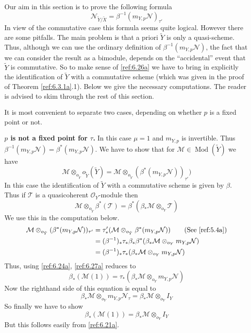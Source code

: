 \documentclass{amsproc}
\def\Mscr{{\mathcal M}}
\def\Nscr{{\mathcal N}}
\def\Oscr{{\mathcal O}}
\def\Tscr{{\mathcal T}}
\def\Qch{\operatorname {Mod}}
\let\oldtext\text
\def\text#1{\oldtext{\upshape #1}}
\theoremstyle{definition}
\theoremstyle{remark}
\numberwithin{equation}{section}
\numberwithin{table}{section}
\numberwithin{figure}{section}
\begin{document}
Our aim in this section is to prove the following formula
\begin{equation}
\label{ref:6.26a}
\Nscr_{{\tilde{Y}}/{\tilde{X}}}=\beta^{-1}(m_{Y,p}\Nscr)_{\tau'}
\end{equation}
In view of the commutative case this formula seems quite logical.
However there are some pitfalls. The main problem is that a priori ${\tilde{Y}}$
is only a quasi-scheme. Thus, although we can use the ordinary
definition of $\beta^{-1}(m_{Y,p}\Nscr)$, the fact that we can
consider the result as a bimodule, depends on the ``accidental'' event
that ${\tilde{Y}}$ is commutative. So to make sense of \eqref{ref:6.26a} we
have to bring in explicitly the identification of ${\tilde{Y}}$ with a
commutative scheme (which was given in the proof of Theorem
\ref{ref:6.3.1a}.1). Below we give the necessary computations. The
reader is advised to skim through the rest of this section.


It is most convenient to separate two cases, depending on whether $p$
is a fixed point or not. 

\noindent
{\bf $p$ is not a fixed point for $\tau$.} 
In this case $\mu=1$ and
$m_{Y,p}$ is invertible. Thus
$\beta^{-1}(m_{Y,p}\Nscr)=\beta^{\ast}(m_{Y,p}\Nscr)$. We have to
show that for $\Mscr\in \Qch({\tilde{Y}})$ we have
\begin{equation}
\label{ref:6.27a}
\Mscr\otimes_{o_{\tilde{Y}}}o_{\tilde{Y}}({\tilde{Y}})=\Mscr\otimes_{o_{\tilde{Y}}}(\beta^{\ast}
(m_{Y,p}\Nscr))_{\tau'})
\end{equation}
In this case the identification of ${\tilde{Y}}$ with a commutative scheme is
given by $\beta$. Thus if $\Tscr$ is a quasicoherent $\Oscr_Y$-module then
\[
\Mscr\otimes_{o_{\tilde{Y}}}\beta^{\ast}(\Tscr)=\beta^\ast(\beta_\ast\Mscr\otimes_{o_Y}
\Tscr)
\]
We use this in the computation below.
\begin{align*}
\Mscr\otimes_{o_{\tilde{Y}}}(\beta^{\ast}(m_{Y,p}\Nscr))_{\tau'}
&=\tau'_\ast(\Mscr\otimes_{o_{\tilde{Y}}}\beta^{\ast}(m_{Y,p}\Nscr))\qquad
\text{(See \eqref{ref:5.4a})}\\
&=(\beta^{-1})_\ast\tau_\ast\beta_\ast\beta^\ast(\beta_\ast\Mscr\otimes_{o_Y}
m_{Y,p}\Nscr)\\
&=(\beta^{-1})_\ast\tau_\ast(\beta_\ast\Mscr\otimes_{o_Y}m_{Y,p}\Nscr)
\end{align*}
Thus, using
\eqref{ref:6.24a}, \eqref{ref:6.27a} reduces to
\[
\beta_\ast(\Mscr(1))=\tau_\ast(\beta_\ast\Mscr\otimes_{o_Y}m_{Y,p}\Nscr)
\]
Now the righthand side of this equation is equal to 
\[
\beta_\ast\Mscr\otimes_{o_Y}m_{Y,p}\Nscr_\tau=
\beta_\ast\Mscr\otimes_{o_Y}I_Y
\]
So finally we have to show
\[
\beta_\ast(\Mscr(1))=\beta_\ast\Mscr\otimes_{o_Y}I_Y
\]
But this follows easily from \eqref{ref:6.21a}.
\end{document}
